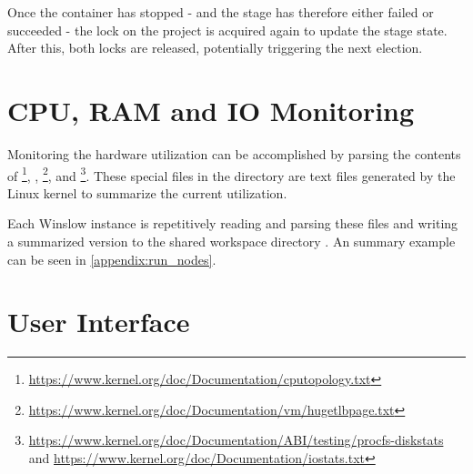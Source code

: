 Once the container has stopped - and the stage has therefore either failed or succeeded - the lock on the project is acquired again to update the stage state.
After this, both locks are released, potentially triggering the next election.

\section{CPU, RAM and IO Monitoring}
\label{design:monitor_resources}

Monitoring the hardware utilization can be accomplished by parsing the contents of \footnote{\url{https://www.kernel.org/doc/Documentation/cputopology.txt}}, , \footnote{\url{https://www.kernel.org/doc/Documentation/vm/hugetlbpage.txt}},  and \linebreak{}\footnote{\url{https://www.kernel.org/doc/Documentation/ABI/testing/procfs-diskstats} and \url{https://www.kernel.org/doc/Documentation/iostats.txt}}.
These special files in the  directory are text files generated by the Linux kernel to summarize the current utilization\cite{linux:doc:proc}.

Each Winslow instance is repetitively reading and parsing these files and writing a summarized version to the shared workspace directory .
An summary example can be seen in \autoref{appendix:run_nodes}.

\section{User Interface}
\label{design:springboot}


